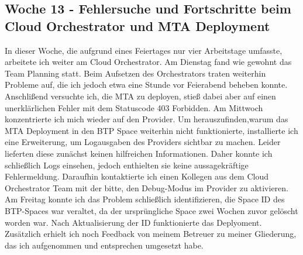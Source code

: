 \subsection{Woche 13 - Fehlersuche und Fortschritte beim Cloud Orchestrator und MTA Deployment}
In dieser Woche, die aufgrund eines Feiertages nur vier Arbeitstage umfasste, arbeitete ich weiter am Cloud Orchestrator.
Am Dienstag fand wie gewohnt das Team Planning statt. Beim Aufsetzen des Orchestrators traten weiterhin Probleme auf, die
ich jedoch etwa eine Stunde vor Feierabend beheben konnte. Anschlißend versuchte ich, die MTA zu deployen, stieß dabei aber
auf einen unerklärlichen Fehler mit dem Statuscode 403 Forbidden.
Am Mittwoch konzentrierte ich mich wieder auf den Provider.
Um herauszufinden,warum das MTA Deployment in den BTP Space weiterhin nicht funktionierte, installierte ich eine Erweiterung,
um Logausgaben des Providers sichtbar zu machen.
Leider lieferten diese zunächst keinen hilfreichen Informationen.
Daher konnte ich schließlich Logs einsehen, jedoch enthielten sie keine aussagekräftige Fehlermeldung.
Daraufhin kontaktierte ich einen Kollegen aus dem Cloud Orchestrator Team mit der bitte, den Debug-Modus im Provider zu aktivieren.
Am Freitag konnte ich das Problem schließlich identifizieren, die Space ID des BTP-Spaces war veraltet, da der ursprüngliche
Space zwei Wochen zuvor gelöscht worden war.
Nach Aktualisierung der ID funktionierte das Deplyoment.
Zusätzlich erhielt ich noch Feedback von meinem Betreuer zu meiner Gliederung, das ich aufgenommen und entsprechen umgesetzt habe.

